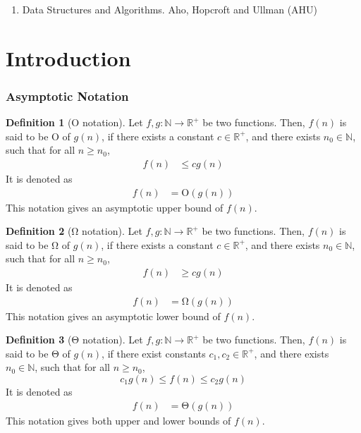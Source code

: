 \documentclass[titlepage, fleqn, a4paper, 12pt, twoside]{article}
\theoremstyle{definition}
\newtheorem{definition}{Definition}
\theoremstyle{theorem}
\begin{document}
\begin{enumerate}
	\item Data Structures and Algorithms. Aho, Hopcroft and Ullman (AHU)
\end{enumerate}

\clearpage
{}

\part{Introduction}

\section{Asymptotic Notation}

\begin{definition}[$\mathrm{O}$ notation]
	Let $f,g : \mathbb{N} \to \mathbb{R}^+$ be two functions.
	Then, $f(n)$ is said to be $\mathrm{O}$ of $g(n)$, if there exists a constant $c \in \mathbb{R}^+$, and there exists $n_0 \in \mathbb{N}$, such that for all $n \ge n_0$,
	\begin{align*}
		f(n) & \le c g(n)
	\end{align*}
	It is denoted as
	\begin{align*}
		f(n) & = \mathrm{O}\left( g(n) \right)
	\end{align*}
	This notation gives an asymptotic upper bound of $f(n)$.
\end{definition}

\begin{definition}[$\mathrm{\Omega}$ notation]
	Let $f,g : \mathbb{N} \to \mathbb{R}^+$ be two functions.
	Then, $f(n)$ is said to be $\mathrm{\Omega}$ of $g(n)$, if there exists a constant $c \in \mathbb{R}^+$, and there exists $n_0 \in \mathbb{N}$, such that for all $n \ge n_0$,
	\begin{align*}
		f(n) & \ge c g(n)
	\end{align*}
	It is denoted as
	\begin{align*}
		f(n) & = \mathrm{\Omega}\left( g(n) \right)
	\end{align*}
	This notation gives an asymptotic lower bound of $f(n)$.
\end{definition}

\begin{definition}[$\mathrm{\Theta}$ notation]
	Let $f,g : \mathbb{N} \to \mathbb{R}^+$ be two functions.
	Then, $f(n)$ is said to be $\mathrm{\Theta}$ of $g(n)$, if there exist constants $c_1,c_2 \in \mathbb{R}^+$, and there exists $n_0 \in \mathbb{N}$, such that for all $n \ge n_0$,
	\begin{equation*}
		c_1 g(n) \le f(n) \le c_2 g(n)
	\end{equation*}
	It is denoted as
	\begin{align*}
		f(n) & = \mathrm{\Theta}\left( g(n) \right)
	\end{align*}
	This notation gives both upper and lower bounds of $f(n)$.
\end{definition}
\end{document}
